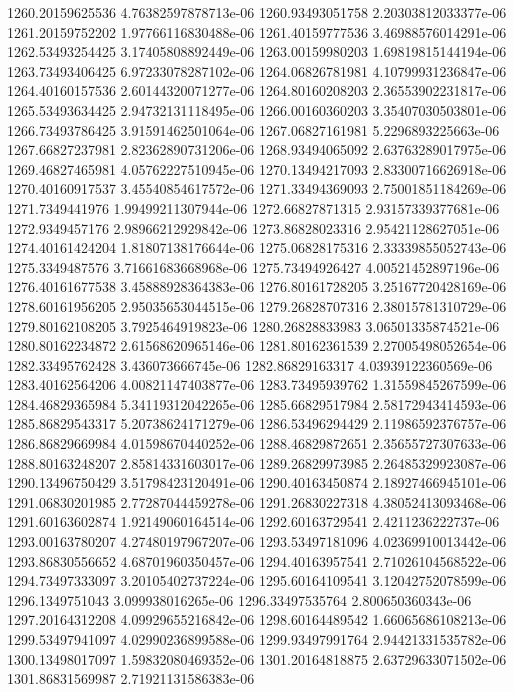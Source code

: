 {1260.20159625536 4.76382597878713e-06
1260.93493051758 2.20303812033377e-06
1261.20159752202 1.97766116830488e-06
1261.40159777536 3.46988576014291e-06
1262.53493254425 3.17405808892449e-06
1263.00159980203 1.69819815144194e-06
1263.73493406425 6.97233078287102e-06
1264.06826781981 4.10799931236847e-06
1264.40160157536 2.60144320071277e-06
1264.80160208203 2.36553902231817e-06
1265.53493634425 2.94732131118495e-06
1266.00160360203 3.35407030503801e-06
1266.73493786425 3.91591462501064e-06
1267.06827161981 5.2296893225663e-06
1267.66827237981 2.82362890731206e-06
1268.93494065092 2.63763289017975e-06
1269.46827465981 4.05762227510945e-06
1270.13494217093 2.83300716626918e-06
1270.40160917537 3.45540854617572e-06
1271.33494369093 2.75001851184269e-06
1271.7349441976 1.99499211307944e-06
1272.66827871315 2.93157339377681e-06
1272.9349457176 2.98966212929842e-06
1273.86828023316 2.95421128627051e-06
1274.40161424204 1.81807138176644e-06
1275.06828175316 2.33339855052743e-06
1275.3349487576 3.71661683668968e-06
1275.73494926427 4.00521452897196e-06
1276.40161677538 3.45888928364383e-06
1276.80161728205 3.25167720428169e-06
1278.60161956205 2.95035653044515e-06
1279.26828707316 2.38015781310729e-06
1279.80162108205 3.7925464919823e-06
1280.26828833983 3.06501335874521e-06
1280.80162234872 2.61568620965146e-06
1281.80162361539 2.27005498052654e-06
1282.33495762428 3.436073666745e-06
1282.86829163317 4.03939122360569e-06
1283.40162564206 4.00821147403877e-06
1283.73495939762 1.31559845267599e-06
1284.46829365984 5.34119312042265e-06
1285.66829517984 2.58172943414593e-06
1285.86829543317 5.20738624171279e-06
1286.53496294429 2.11986592376757e-06
1286.86829669984 4.01598670440252e-06
1288.46829872651 2.35655727307633e-06
1288.80163248207 2.85814331603017e-06
1289.26829973985 2.26485329923087e-06
1290.13496750429 3.51798423120491e-06
1290.40163450874 2.18927466945101e-06
1291.06830201985 2.77287044459278e-06
1291.26830227318 4.38052413093468e-06
1291.60163602874 1.92149060164514e-06
1292.60163729541 2.4211236222737e-06
1293.00163780207 4.27480197967207e-06
1293.53497181096 4.02369910013442e-06
1293.86830556652 4.68701960350457e-06
1294.40163957541 2.71026104568522e-06
1294.73497333097 3.20105402737224e-06
1295.60164109541 3.12042752078599e-06
1296.1349751043 3.099938016265e-06
1296.33497535764 2.800650360343e-06
1297.20164312208 4.09929655216842e-06
1298.60164489542 1.66065686108213e-06
1299.53497941097 4.02990236899588e-06
1299.93497991764 2.94421331535782e-06
1300.13498017097 1.59832080469352e-06
1301.20164818875 2.63729633071502e-06
1301.86831569987 2.71921131586383e-06
}
